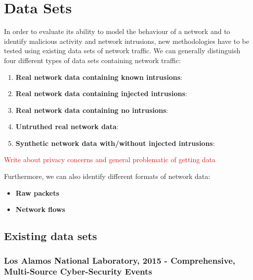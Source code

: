 \documentclass[a4paper,12pt,twoside]{report}
\begin{document}
\section{Data Sets}

In order to evaluate its ability to model the behaviour of a network and to identify malicious activity and network intrusions, new methodologies have to be tested using existing data sets of network traffic. We can generally distinguish four different types of data sets containing network traffic:

\begin{enumerate}

\item \textbf{Real network data containing known intrusions}: 

\item \textbf{Real network data containing injected intrusions}:

\item \textbf{Real network data containing no intrusions}:

\item \textbf{Untruthed real network data}:

\item \textbf{Synthetic network data with/without injected intrusions}:

\end{enumerate}

\textcolor{red}{Write about privacy concerns and general problematic of getting data}

Furthermore, we can also identify different formats of network data:

\begin{itemize}

\item \textbf{Raw packets}


\item \textbf{Network flows}

\end{itemize}

\subsection{Existing data sets}

\subsubsection*{Los Alamos National Laboratory, 2015 - Comprehensive, Multi-Source Cyber-Security Events \cite{akent-2015-enterprise-data}\cite{kent-2015-cyberdata1}}
\end{document}
